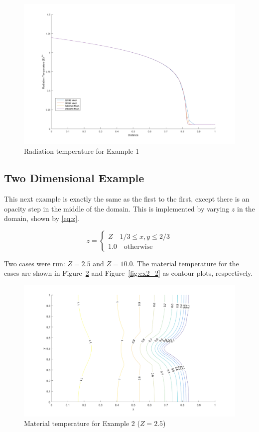 \documentclass[11pt]{scrartcl}
\newcommand{\fig}[1]{Figure~\ref{#1}}                      %
\newcommand{\be}{\begin{equation}}
\newcommand{\ee}{\end{equation}}
\begin{document}
\begin{figure}[htpb!]
\centering
\includegraphics[width=\linewidth]{Example1.png}
\caption{Radiation temperature for Example 1}
\label{fig:ex1_paper}
\end{figure}

\subsection{\bf Two Dimensional Example}

This next example is exactly the same as the first to the first, except there is an opacity step in the middle of the domain.  This is implemented by varying $z$ in the domain, shown by \eqref{eq:z}.

\be 
z=\begin{cases}
Z \quad 1/3 \leq x,y \leq 2/3\\
1.0 \quad \text{otherwise}
\end{cases}
\label{eq:z}
\ee

Two cases were run: $Z=2.5$ and $Z=10.0$.  The material temperature for the cases are shown in \fig{fig:ex2_1} and \fig{fig:ex2_2} as contour plots, respectively.

\begin{figure}[htpb!]
\centering
\includegraphics[width=\linewidth]{Example2_1.png}
\caption{Material temperature for Example 2 ($Z=2.5$)}
\label{fig:ex2_1}
\end{figure}
\end{document}
